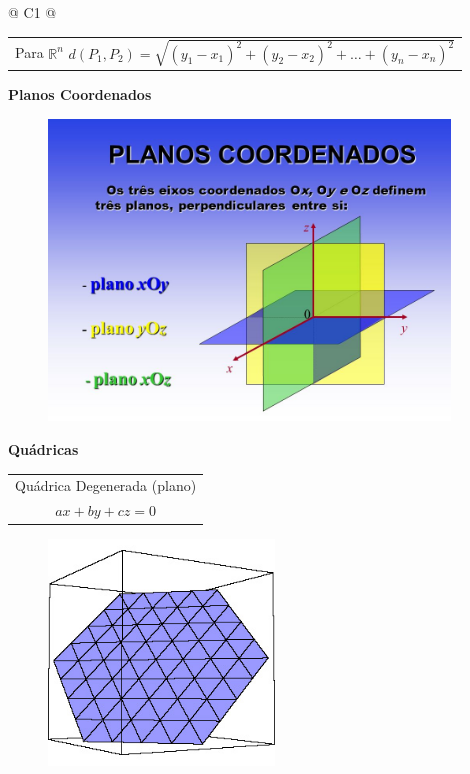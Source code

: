 \begin{longtable}{
		@{}
		C{1\textwidth} 
		@{}}
{\begin{tabular}[c]{@{}c@{}}
				Para $\mathbb{R}^{n}$ \hspace{1cm} $d(P_{1}, P_{2}) = \sqrt{(y_{1} - x_{1})^{2} + (y_{2} - x_{2})^{2} + \dots + (y_{n} - x_{n})^{2}}$

			\end{tabular}}
			\tabularnewline
			\midrule
			\textbf{Planos Coordenados}
			\tabularnewline
			\midrule
			\begin{figure}[H]
			    \centering
				\includegraphics[height=8cm]{images/google-images_planos-coordenados}
			\end{figure}
			\tabularnewline
			\midrule
			\textbf{Quádricas}
			\tabularnewline
			\midrule
			\begin{tabular}[c]{@{}c@{}} 

				{\large Quádrica Degenerada (plano)} \\

				{\large $ax + by + cz = 0$} \\
				
			\end{tabular}

			\begin{figure}[H]
                \centering			    
            	\includegraphics[height=6cm]{images/ufmg_figura-1-3}
			\end{figure}
			\tabularnewline
			\midrule
			\begin{tabular}[c]{@{}c@{}} 


\end{tabular}
\end{longtable}
